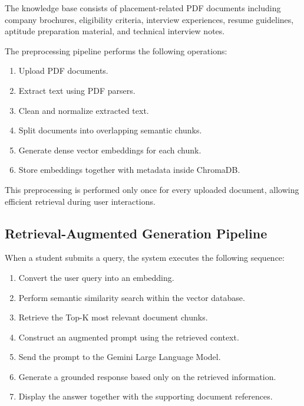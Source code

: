 \documentclass[11pt]{article}
\begin{document}
The knowledge base consists of placement-related PDF documents including company brochures, eligibility criteria, interview experiences, resume guidelines, aptitude preparation material, and technical interview notes.

The preprocessing pipeline performs the following operations:

\begin{enumerate}

\item Upload PDF documents.

\item Extract text using PDF parsers.

\item Clean and normalize extracted text.

\item Split documents into overlapping semantic chunks.

\item Generate dense vector embeddings for each chunk.

\item Store embeddings together with metadata inside ChromaDB.

\end{enumerate}

This preprocessing is performed only once for every uploaded document, allowing efficient retrieval during user interactions.

\subsection{Retrieval-Augmented Generation Pipeline}

When a student submits a query, the system executes the following sequence:

\begin{enumerate}

\item Convert the user query into an embedding.

\item Perform semantic similarity search within the vector database.

\item Retrieve the Top-K most relevant document chunks.

\item Construct an augmented prompt using the retrieved context.

\item Send the prompt to the Gemini Large Language Model.

\item Generate a grounded response based only on the retrieved information.

\item Display the answer together with the supporting document references.

\end{enumerate}
\end{document}

